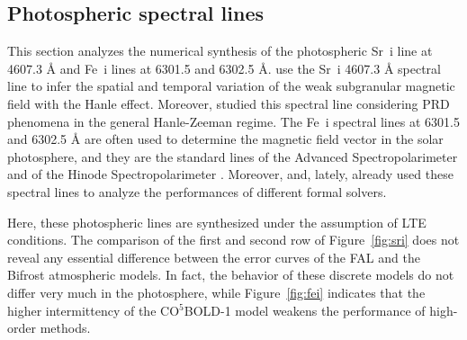 \documentclass[iop,numberedappendix,twocolappendix,twocolumn]{emulateapj}
\begin{document}
\subsection{Photospheric spectral lines}\label{subsec:5.1}
%
This section analyzes the numerical synthesis of the photospheric Sr~{\sc i} line at 4607.3 {\rm \AA} and Fe~{\sc i} lines at 6301.5 and 6302.5 {\rm \AA}.
\citet{bianda2018} use the Sr~{\sc i} 4607.3 {\rm \AA} spectral line to infer
the spatial and temporal variation of the weak subgranular magnetic field with the Hanle effect.
Moreover, \citet{alsinaballester2017} studied this spectral line
considering PRD phenomena in the general Hanle-Zeeman regime.
The Fe~{\sc i} spectral lines at 6301.5 and 6302.5 {\rm \AA}  are often used to determine the magnetic field vector in the solar photosphere,
and they are the standard lines of the Advanced Spectropolarimeter \citep{skumanich1994} and of the Hinode Spectropolarimeter \citep{tsuneta2008}. 
Moreover, \citet{bellot_rubio+al1998} and, lately, \citet{delacruz_rodriguez+piskunov2013} already used these spectral lines to analyze the performances of different formal solvers.

Here, these photospheric lines are synthesized under the assumption of LTE conditions.
% 
The comparison of the first and second row of Figure~\ref{fig:sri} does not reveal any essential difference between the error curves
of the FAL and the Bifrost atmospheric models.
In fact, the behavior of these discrete models do not differ very much in the photosphere,
while Figure~\ref{fig:fei} indicates that the higher intermittency of the CO$^5$BOLD-1 model weakens the performance of high-order methods.
\end{document}
